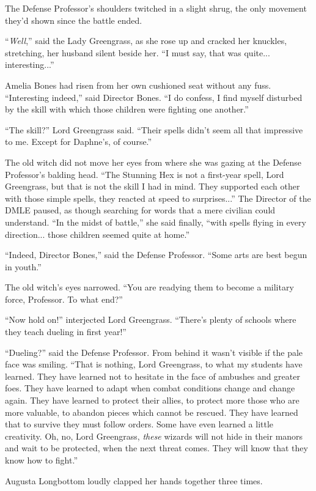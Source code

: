 The Defense Professor's shoulders twitched in a slight shrug, the only movement they'd shown since the battle ended.

``\emph{Well},'' said the Lady Greengrass, as she rose up and cracked her knuckles, stretching, her husband silent beside her. ``I must say, that was quite... interesting...''

Amelia Bones had risen from her own cushioned seat without any fuss. ``Interesting indeed,'' said Director Bones. ``I do confess, I find myself disturbed by the skill with which those children were fighting one another.''

``The skill?'' Lord Greengrass said. ``Their spells didn't seem all that impressive to me. Except for Daphne's, of course.''

The old witch did not move her eyes from where she was gazing at the Defense Professor's balding head. ``The Stunning Hex is not a first-year spell, Lord Greengrass, but that is not the skill I had in mind. They supported each other with those simple spells, they reacted at speed to surprises...'' The Director of the DMLE paused, as though searching for words that a mere civilian could understand. ``In the midst of battle,'' she said finally, ``with spells flying in every direction... those children seemed quite at home.''

``Indeed, Director Bones,'' said the Defense Professor. ``Some arts are best begun in youth.''

The old witch's eyes narrowed. ``You are readying them to become a military force, Professor. To what end?''

``Now hold on!'' interjected Lord Greengrass. ``There's plenty of schools where they teach dueling in first year!''

``Dueling?'' said the Defense Professor. From behind it wasn't visible if the pale face was smiling. ``That is nothing, Lord Greengrass, to what my students have learned. They have learned not to hesitate in the face of ambushes and greater foes. They have learned to adapt when combat conditions change and change again. They have learned to protect their allies, to protect more those who are more valuable, to abandon pieces which cannot be rescued. They have learned that to survive they must follow orders. Some have even learned a little creativity. Oh, no, Lord Greengrass, \emph{these} wizards will not hide in their manors and wait to be protected, when the next threat comes. They will know that they know how to fight.''

Augusta Longbottom loudly clapped her hands together three times.

